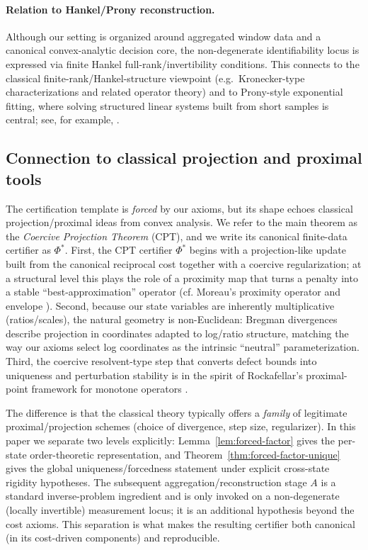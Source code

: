 \documentclass[11pt,reqno]{amsart}
\theoremstyle{definition}
\theoremstyle{remark}
\newcommand{\1}{\mathbf{1}}
\begin{document}
\paragraph{Relation to Hankel/Prony reconstruction.} Although our setting is organized around aggregated window data and a canonical convex-analytic decision core, the non-degenerate identifiability locus is expressed via finite Hankel full-rank/invertibility conditions. This connects to the classical finite-rank/Hankel-structure viewpoint (e.g.\ Kronecker-type characterizations and related operator theory) and to Prony-style exponential fitting, where solving structured linear systems built from short samples is central; see, for example, \cite{peller2003hankel,osborne1995prony}.

\subsection{Connection to classical projection and proximal tools}
The certification template is \emph{forced} by our axioms, but its shape echoes classical projection/proximal
ideas from convex analysis. We refer to the main theorem as the \emph{Coercive Projection Theorem} (CPT), and we
write its canonical finite-data certifier as $\Phi^\ast$. First, the CPT certifier $\Phi^\ast$ begins with a projection-like update built from the
canonical reciprocal cost together with a coercive regularization; at a structural level this plays the role of
a proximity map that turns a penalty into a stable ``best-approximation'' operator (cf. Moreau's proximity
operator and envelope \cite{moreau1965}). Second, because our state variables are inherently multiplicative
(ratios/scales), the natural geometry is non-Euclidean: Bregman divergences \cite{bregman1967} describe projection in coordinates adapted to log/ratio structure, matching the way our axioms select log coordinates as
the intrinsic ``neutral'' parameterization. Third, the coercive resolvent-type step that converts defect bounds
into uniqueness and perturbation stability is in the spirit of Rockafellar's proximal-point framework for
monotone operators \cite{rockafellar1976}.

The difference is that the classical theory typically offers a \emph{family} of legitimate proximal/projection
schemes (choice of divergence, step size, regularizer). In this paper we separate two levels explicitly: Lemma~\ref{lem:forced-factor} gives the per-state order-theoretic representation, and Theorem~\ref{thm:forced-factor-unique} gives the global uniqueness/forcedness statement under explicit cross-state rigidity hypotheses. The subsequent aggregation/reconstruction stage $A$ is a standard inverse-problem ingredient and is only invoked on a non-degenerate (locally invertible) measurement locus; it is an additional hypothesis beyond the cost axioms. This separation is what makes the resulting certifier both canonical (in its cost-driven components) and reproducible.
\end{document}
